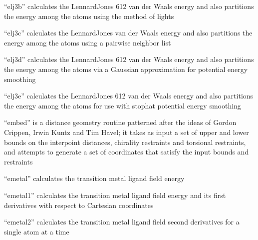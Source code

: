 \documentclass[letterpaper,11pt,english]{sphinxmanual}
\begin{document}
\sphinxAtStartPar
{}

\sphinxAtStartPar
“elj3b” calculates the Lennard\sphinxhyphen{}Jones 6\sphinxhyphen{}12 van der Waals energy and also partitions the energy among the atoms using the method of lights

\sphinxAtStartPar
{}

\sphinxAtStartPar
“elj3c” calculates the Lennard\sphinxhyphen{}Jones van der Waals energy and also partitions the energy among the atoms using a pairwise neighbor list

\sphinxAtStartPar
{}

\sphinxAtStartPar
“elj3d” calculates the Lennard\sphinxhyphen{}Jones 6\sphinxhyphen{}12 van der Waals energy and also partitions the energy among the atoms via a Gaussian approximation for potential energy smoothing

\sphinxAtStartPar
{}

\sphinxAtStartPar
“elj3e” calculates the Lennard\sphinxhyphen{}Jones 6\sphinxhyphen{}12 van der Waals energy and also partitions the energy among the atoms for use with stophat potential energy smoothing

\sphinxAtStartPar
{}

\sphinxAtStartPar
“embed” is a distance geometry routine patterned after the ideas of Gordon Crippen, Irwin Kuntz and Tim Havel; it takes as input a set of upper and lower bounds on the interpoint distances, chirality restraints and torsional restraints, and attempts to generate a set of coordinates that satisfy the input bounds and restraints

\sphinxAtStartPar
{}

\sphinxAtStartPar
“emetal” calculates the transition metal ligand field energy

\sphinxAtStartPar
{}

\sphinxAtStartPar
“emetal1” calculates the transition metal ligand field energy and its first derivatives with respect to Cartesian coordinates

\sphinxAtStartPar
{}

\sphinxAtStartPar
“emetal2” calculates the transition metal ligand field second derivatives for a single atom at a time

\sphinxAtStartPar
{}
\end{document}
